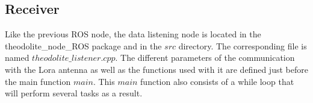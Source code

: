 \documentclass[10pt,letterpaper,oneside]{article}
\begin{document}



\subsection{Receiver}

Like the previous ROS node, the data listening node is located in the theodolite\_node\_ROS package and in the $src$ directory.
The corresponding file is named $theodolite\_listener.cpp$.
The different parameters of the communication with the Lora antenna as well as the functions used with it are defined just before the main function $main$.
This $main$ function also consists of a while loop that will perform several tasks as a result.
\end{document}
